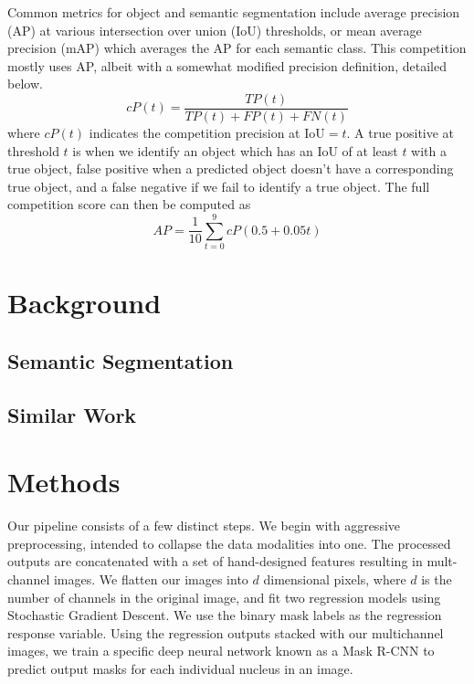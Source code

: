 \documentclass[paper=letter, fontsize=12pt]{article}
\numberwithin{equation}{section} %
\numberwithin{figure}{section} %
\numberwithin{table}{section} %
\begin{document}
Common metrics for object and semantic segmentation include average precision
(AP) at various intersection over union (IoU) thresholds, or mean average
precision (mAP) which averages the AP for each semantic class.  This
competition mostly uses AP, albeit with a somewhat modified precision
definition, detailed below.
\begin{equation}
    cP(t) = \frac{TP(t)}{TP(t) + FP(t) + FN(t)}
\end{equation}
where $cP(t)$ indicates the competition precision at $\text{IoU}=t$.  A true
positive at threshold $t$ is when we identify an object which has an IoU of at
least $t$ with a true object, false positive when a predicted object doesn't
have a corresponding true object, and a false negative if we fail to identify a
true object.  The full competition score can then be computed as
\begin{equation}
    AP = \frac{1}{10}\sum_{t = 0}^{9} cP(0.5 + 0.05t)
\end{equation}

\section{Background}

\subsection{Semantic Segmentation}

\subsection{Similar Work}

\section{Methods}

Our pipeline consists of a few distinct steps.  We begin with aggressive
preprocessing, intended to collapse the data modalities into one.  The
processed outputs are concatenated with a set of hand-designed features
resulting in mult-channel images.  We flatten our images into $d$ dimensional
pixels, where $d$ is the number of channels in the original image, and fit two
regression models using Stochastic Gradient Descent.  We use the binary mask
labels as the regression response variable.  Using the regression outputs
stacked with our multichannel images, we train a specific deep neural network
known as a Mask R-CNN to predict output masks for each individual nucleus in an
image.
\end{document}
